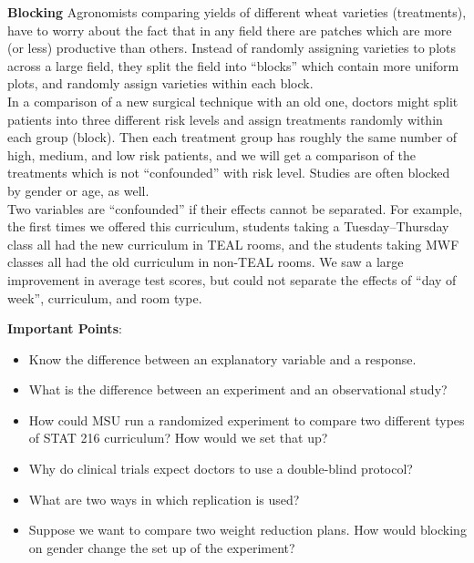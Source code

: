   {\bf Blocking} Agronomists comparing yields of different wheat
  varieties (treatments), have to worry about the fact that in any
  field there are patches which are more (or less) productive than
  others. Instead of randomly assigning varieties to plots across a
  large field, they split the field into ``blocks'' which contain more
  uniform plots, and randomly assign varieties within each block. \\
  In a comparison of a new surgical technique with an old one, doctors
  might split patients into three different risk levels and assign
  treatments randomly within each group (block).  Then each treatment
  group has roughly the same number of high, medium, and low risk
  patients, and we will get a comparison of the treatments which is
  not ``confounded'' with risk level.  Studies are often blocked by
  gender or age, as well.\\
  Two variables are ``confounded'' if their effects cannot be
  separated.  For example, the first times we offered this curriculum,
  students taking a Tuesday--Thursday class all had the new curriculum
  in TEAL rooms, and the students taking MWF classes all had the old
  curriculum in non-TEAL rooms.  We saw a large improvement in average
  test scores, but could not separate the effects of ``day of week'',
  curriculum, and room type.


{\bf Important Points}:
\begin{itemize}
\item Know the difference between an explanatory variable and a
  response.\vfill
\item What is the difference between an experiment and an
  observational study?\vfill
\item How could MSU run a randomized experiment to compare two different
  types of STAT 216 curriculum?  How would we  set that up?\vfill
\item Why do clinical trials expect doctors to use a double-blind protocol?\vfill
\item What are two ways in which replication is used? \vfill
\item Suppose we want to compare two weight reduction plans.  How
  would blocking on gender change the set up of the experiment?    \vspace*{\fill}
\end{itemize}
